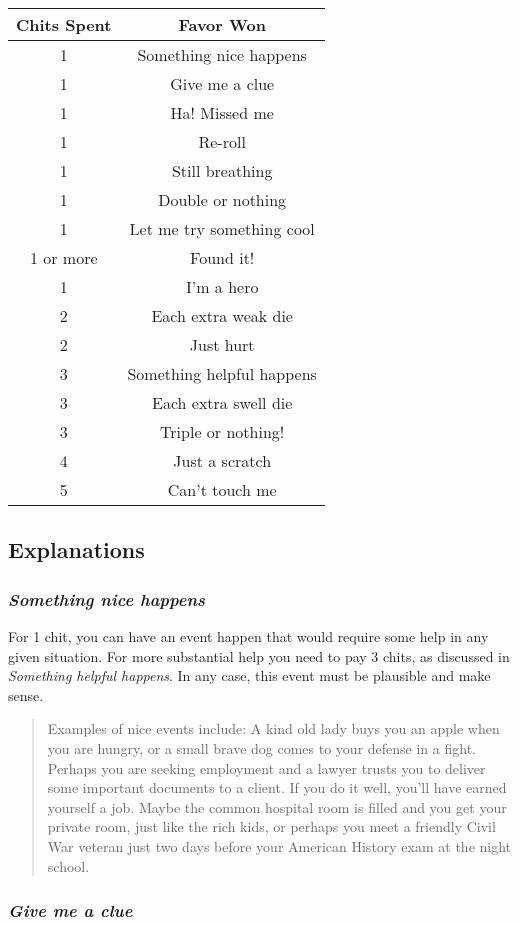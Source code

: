 \noindent \begin{center}
\begin{tabular}{cc}
\toprule 
Chits Spent & Favor Won\tabularnewline
\midrule
\midrule 
1 & Something nice happens\tabularnewline
\midrule 
1 & Give me a clue\tabularnewline
\midrule 
1 & Ha! Missed me\tabularnewline
\midrule 
1 & Re-roll \tabularnewline
\midrule 
1 & Still breathing\tabularnewline
\midrule 
1 & Double or nothing\tabularnewline
\midrule 
1 & Let me try something cool\tabularnewline
\midrule 
1 or more & Found it!\tabularnewline
\midrule 
1 & I'm a hero\tabularnewline
\midrule 
2 & Each extra weak die\tabularnewline
\midrule 
2 & Just hurt\tabularnewline
\midrule 
3 & Something helpful happens\tabularnewline
\midrule 
3 & Each extra swell die\tabularnewline
\midrule 
3 & Triple or nothing!\tabularnewline
\midrule 
4 & Just a scratch\tabularnewline
\midrule 
5 & Can't touch me\tabularnewline
\end{tabular}
\par\end{center}


\subsection*{Explanations}


\subsubsection*{\emph{Something nice happens}}

For 1 chit, you can have an event happen that would require some help
in any given situation. For more substantial help you need to pay
3 chits, as discussed in \emph{Something helpful happens}. In any
case, this event must be plausible and make sense.
\begin{quote}
Examples of nice events include: A kind old lady buys you an apple
when you are hungry, or a small brave dog comes to your defense in
a fight. Perhaps you are seeking employment and a lawyer trusts you
to deliver some important documents to a client. If you do it well,
you'll have earned yourself a job. Maybe the common hospital room
is filled and you get your private room, just like the rich kids,
or perhaps you meet a friendly Civil War veteran just two days before
your American History exam at the night school.
\end{quote}

\subsubsection*{\emph{Give me a clue}}

